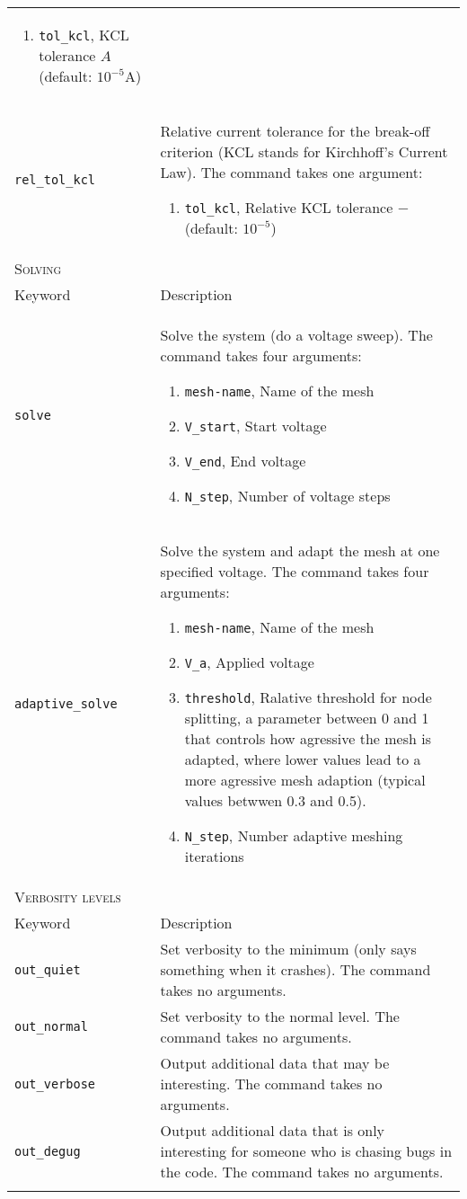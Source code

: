 \documentclass[noshowpacs,preprintnumbers,amsmath,amssymb, letter]{revtex4}
\begin{document}
\begin{longtable}{p{}p{}}
\begin{enumerate}
\item \texttt{tol\_kcl}, KCL tolerance $A$ (default: $10^{-5} \text{A}$)
\end{enumerate}\\
\texttt{rel\_tol\_kcl}	&  Relative current tolerance for the break-off criterion (KCL stands for Kirchhoff's Current Law). The command takes one argument:
\begin{enumerate}
\item \texttt{tol\_kcl}, Relative KCL tolerance $-$ (default: $10^{-5}$)
\end{enumerate}\\
\multicolumn{2}{l}{\textsc{Solving}} \\*
\hline
Keyword & Description \\
\texttt{solve}	&  Solve the system (do a voltage sweep). The command takes four arguments:
\begin{enumerate}
\item \texttt{mesh-name}, Name of the mesh
\item \texttt{V\_start}, Start voltage
\item \texttt{V\_end}, End voltage
\item \texttt{N\_step}, Number of voltage steps
\end{enumerate}\\
\texttt{adaptive\_solve}	&  Solve the system and adapt the mesh at one specified voltage. The command takes four arguments:
\begin{enumerate}
\item \texttt{mesh-name}, Name of the mesh
\item \texttt{V\_a}, Applied voltage
\item \texttt{threshold}, Ralative threshold for node splitting, a parameter between 0 and 1 that controls how agressive the mesh is adapted, where lower values lead to a more agressive mesh adaption (typical values betwwen 0.3 and 0.5).
\item \texttt{N\_step}, Number adaptive meshing iterations
\end{enumerate}\\
\multicolumn{2}{l}{\textsc{Verbosity levels}} \\*
\hline
Keyword & Description \\
\texttt{out\_quiet}	&  Set verbosity to the minimum (only says something when it crashes). The command takes no arguments.\\
\texttt{out\_normal}	&  Set verbosity to the normal level. The command takes no arguments.\\
\texttt{out\_verbose}	&  Output additional data that may be interesting. The command takes no arguments.\\
\texttt{out\_degug}	&  Output additional data that is only interesting for someone who is chasing bugs in the code. The command takes no arguments.\\
\hline
\\
\end{longtable}
\end{document}
